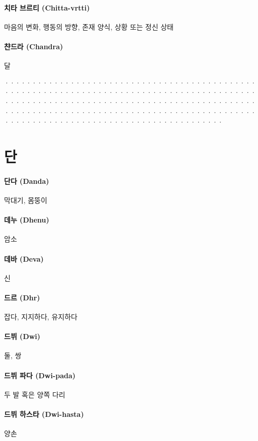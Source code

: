 \documentclass[12pt, a4paper, oneside]{book}
\let\stdsection\section
\renewcommand\section{\newpage\stdsection}
\begin{document}
\paragraph{치타 브르티 (Chitta-vrtti)}
마음의 변화, 행동의 방향, 존재 양식, 상황 또는 정신 상태

\paragraph{챤드라 (Chandra)}
달

································································································································································································································

\newpage
\section{단}

\paragraph{단다 (Danda)}
막대기, 몸뚱이

\paragraph{데누 (Dhenu)}
암소

\paragraph{데바 (Deva)}
신

\paragraph{드르 (Dhr)}
잡다, 지지하다, 유지하다

\paragraph{드뷔 (Dwi)}
둘, 쌍

\paragraph{드뷔 파다 (Dwi-pada)}
두 발 혹은 양쪽 다리

\paragraph{드뷔 하스타 (Dwi-hasta)}
양손
\end{document}
